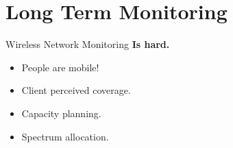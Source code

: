 \section{Long Term Monitoring}

\begin{frame}{Wireless Network Monitoring}
  \huge\textbf{Is hard.}
  \large
  \begin{itemize}
    \item People are mobile!
    \item Client perceived coverage.
    \item Capacity planning.
    \item Spectrum allocation.
  \end{itemize}
\end{frame}
